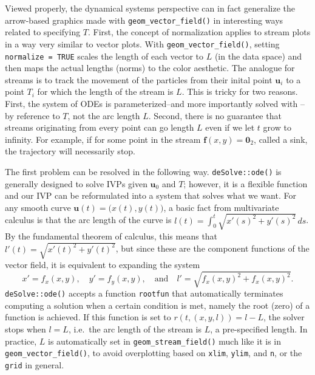 Viewed properly, the dynamical systems perspective can in fact generalize the arrow-based graphics made with \texttt{geom\_vector\_field()} in interesting ways related to specifying \(T\). First, the concept of normalization applies to stream plots in a way very similar to vector plots. With \texttt{geom\_vector\_field()}, setting \texttt{normalize\ =\ TRUE} scales the length of each vector to \(L\) (in the data space) and then maps the actual lengths (norms) to the color aesthetic. The analogue for streams is to track the movement of the particles from their inital point \(\mathbf{u}_{i}\) to a point \(T_{i}\) for which the length of the stream is \(L\). This is tricky for two reasons. First, the system of ODEs is parameterized--and more importantly solved with --by reference to \(T\), not the arc length \(L\). Second, there is no guarantee that streams originating from every point can go length \(L\) even if we let \(t\) grow to infinity. For example, if for some point in the stream \(\mathbf{f}(x,y) = \mathbf{0}_{2}\), called a sink, the trajectory will necessarily stop.

The first problem can be resolved in the following way. \texttt{deSolve::ode()} is generally designed to solve IVPs given \(\mathbf{u}_{0}\) and \(T\); however, it is a flexible function and our IVP can be reformulated into a system that solves what we want. For any smooth curve \(\mathbf{u}(t) = \big(x(t),y(t)\big)\), a basic fact from multivariate calculus is that the arc length of the curve is \(l(t) = \int_{0}^{t}\sqrt{x'(s)^{2} + y'(s)^{2}}\,ds\). By the fundamental theorem of calculus, this means that \(l'(t) = \sqrt{x'(t)^{2} + y'(t)^{2}}\), but since these are the component functions of the vector field, it is equivalent to expanding the system
\[x' = f_{x}(x,y), \quad y' = f_{y}(x,y), \quad \mbox{and} \quad l' = \sqrt{f_{x}(x,y)^{2} + f_{x}(x,y)^{2}}.\]
\texttt{deSolve::ode()} accepts a function \texttt{rootfun} that automatically terminates computing a solution when a certain condition is met, namely the root (zero) of a function is achieved. If this function is set to \(r(t,(x,y,l)) = l - L\), the solver stops when \(l = L\), i.e.~the arc length of the stream is \(L\), a pre-specified length. In practice, \(L\) is automatically set in \texttt{geom\_stream\_field()} much like it is in \texttt{geom\_vector\_field()}, to avoid overplotting based on \texttt{xlim}, \texttt{ylim}, and \texttt{n}, or the \texttt{grid} in general.

